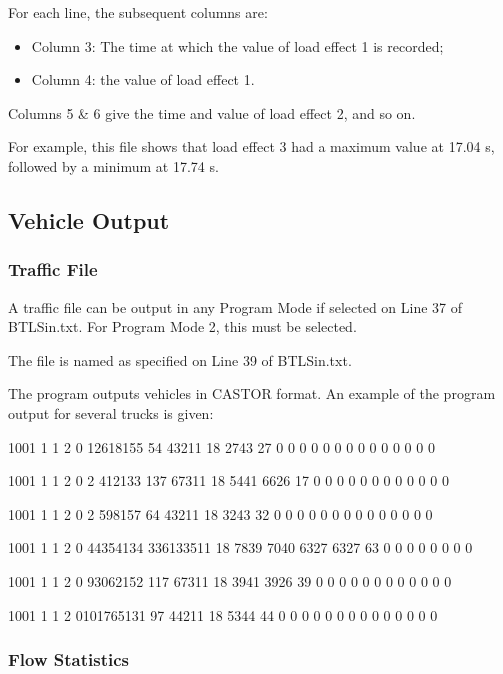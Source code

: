 \documentclass[
]{article}
\begin{document}
For each line, the subsequent columns are:

\begin{itemize}
\item
  Column 3: The time at which the value of load effect 1 is recorded;
\item
  Column 4: the value of load effect 1.
\end{itemize}

Columns 5 \& 6 give the time and value of load effect 2, and so on.

For example, this file shows that load effect 3 had a maximum value at
17.04 s, followed by a minimum at 17.74 s.

\subsection{Vehicle Output}\label{vehicle-output}

\subsubsection*{Traffic File}\label{traffic-file}

A traffic file can be output in any Program Mode if selected on Line 37
of BTLSin.txt. For Program Mode 2, this must be selected.

The file is named as specified on Line 39 of BTLSin.txt.

The program outputs vehicles in CASTOR format. An example of the program
output for several trucks is given:

1001 1 1 2 0 12618155 54 43211 18 2743 27 0 0 0 0 0 0 0 0 0 0 0 0 0 0

1001 1 1 2 0 2 412133 137 67311 18 5441 6626 17 0 0 0 0 0 0 0 0 0 0 0 0

1001 1 1 2 0 2 598157 64 43211 18 3243 32 0 0 0 0 0 0 0 0 0 0 0 0 0 0

1001 1 1 2 0 44354134 336133511 18 7839 7040 6327 6327 63 0 0 0 0 0 0 0
0

1001 1 1 2 0 93062152 117 67311 18 3941 3926 39 0 0 0 0 0 0 0 0 0 0 0 0

1001 1 1 2 0101765131 97 44211 18 5344 44 0 0 0 0 0 0 0 0 0 0 0 0 0 0

\subsubsection*{Flow Statistics}\label{flow-statistics}
\end{document}
